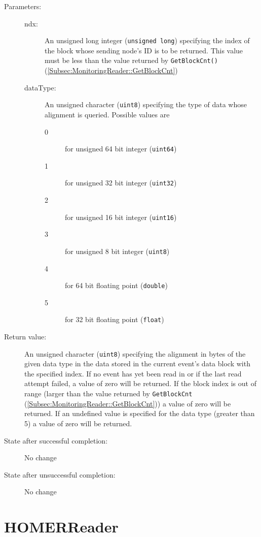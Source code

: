 \documentclass[a4paper,twoside]{article}
\begin{document}
\begin{description}
\item[Parameters:]
	\begin{description}
		\item[ndx:] An unsigned long integer (\texttt{unsigned long}) specifying the index of the block whose sending node's ID is 
		to be returned. This value must be less than the value returned by \texttt{GetBlockCnt()} (\ref{Subsec:MonitoringReader::GetBlockCnt})
	\end{description}
	\begin{description}
		\item[dataType:] An unsigned character (\texttt{uint8}) specifying the type of data whose alignment is queried. Possible values are
			\begin{description}
				\item[0] for unsigned 64 bit integer (\texttt{uint64})
				\item[1] for unsigned 32 bit integer (\texttt{uint32})
				\item[2] for unsigned 16 bit integer (\texttt{uint16})
				\item[3] for unsigned 8 bit integer (\texttt{uint8})
				\item[4] for 64 bit floating point (\texttt{double})
				\item[5] for 32 bit floating point (\texttt{float})
			\end{description}
	\end{description}
\item[Return value:] An unsigned character (\texttt{uint8}) specifying the alignment in bytes of the given data type in the data stored in the current event's data block with the 
specified index. 
If no event has yet been read in or if the last read attempt failed, a value of zero will be returned.
If the block index is out of range (larger than the value returned by \texttt{GetBlockCnt} (\ref{Subsec:MonitoringReader::GetBlockCnt}))
a value of zero will be returned. If an undefined value is specified for the data type (greater than 5) a value of zero will be returned.
\item[State after successful completion:] No change
\item[State after unsuccessful completion:] No change
\end{description}



\section{HOMERReader}
\end{document}
